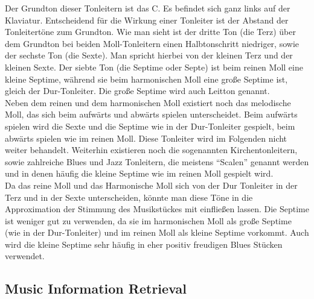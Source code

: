 \documentclass[11pt,a4paper]{article}
\begin{document}
Der Grundton dieser Tonleitern ist das C. Es befindet sich ganz links auf der Klaviatur. Entscheidend für die Wirkung einer Tonleiter ist der Abstand der Tonleitertöne zum Grundton. Wie man sieht ist der dritte Ton (die Terz) über dem Grundton bei beiden Moll-Tonleitern einen Halbtonschritt niedriger, sowie der sechste Ton (die Sexte). Man spricht hierbei von der kleinen Terz und der kleinen Sexte. Der siebte Ton (die Septime oder Septe) ist beim reinen Moll eine kleine Septime, während sie beim harmonischen Moll eine große Septime ist, gleich der Dur-Tonleiter. Die große Septime wird auch Leitton genannt.\\
Neben dem reinen und dem harmonischen Moll existiert noch das melodische Moll, das sich beim aufwärts und abwärts spielen unterscheidet. Beim aufwärts spielen wird die Sexte und die Septime wie in der Dur-Tonleiter gespielt, beim abwärts spielen wie im reinen Moll. Diese Tonleiter wird im Folgenden nicht weiter behandelt. Weiterhin existieren noch die sogenannten Kirchentonleitern, sowie zahlreiche Blues und Jazz Tonleitern, die meistens ``Scalen'' genannt werden und in denen häufig die kleine Septime wie im reinen Moll gespielt wird.\\
Da das reine Moll und das Harmonische Moll sich von der Dur Tonleiter in der Terz und in der Sexte unterscheiden, könnte man diese Töne in die Approximation der Stimmung des Musikstückes mit einfließen lassen. Die Septime ist weniger gut zu verwenden, da sie im harmonischen Moll als große Septime (wie in der Dur-Tonleiter) und im reinen Moll als kleine Septime vorkommt. Auch wird die kleine Septime sehr häufig in eher positiv freudigen Blues Stücken verwendet.


\subsection{Music Information Retrieval}
\end{document}

